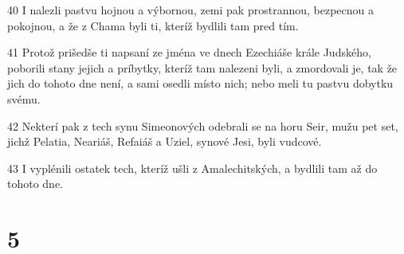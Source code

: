 \par 40 I nalezli pastvu hojnou a výbornou, zemi pak prostrannou, bezpecnou a pokojnou, a že z Chama byli ti, kteríž bydlili tam pred tím.
\par 41 Protož prišedše ti napsaní ze jména ve dnech Ezechiáše krále Judského, poborili stany jejich a príbytky, kteríž tam nalezeni byli, a zmordovali je, tak že jich do tohoto dne není, a sami osedli místo nich; nebo meli tu pastvu dobytku svému.
\par 42 Nekterí pak z tech synu Simeonových odebrali se na horu Seir, mužu pet set, jichž Pelatia, Neariáš, Refaiáš a Uziel, synové Jesi, byli vudcové.
\par 43 I vyplénili ostatek tech, kteríž ušli z Amalechitských, a bydlili tam až do tohoto dne.

\chapter{5}

